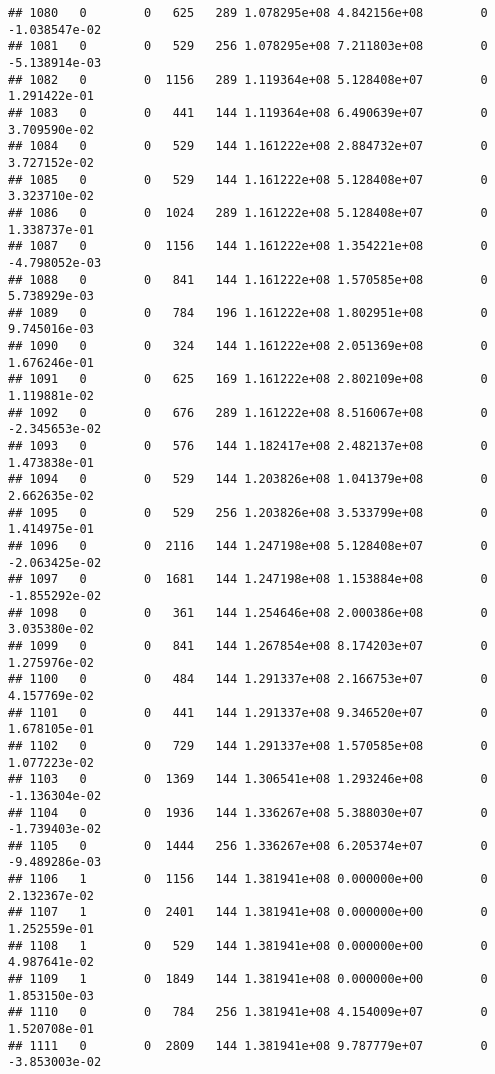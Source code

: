 \documentclass[
]{article}
\begin{document}
\begin{enumerate}
\begin{verbatim}
## 1080   0        0   625   289 1.078295e+08 4.842156e+08        0 -1.038547e-02
## 1081   0        0   529   256 1.078295e+08 7.211803e+08        0 -5.138914e-03
## 1082   0        0  1156   289 1.119364e+08 5.128408e+07        0  1.291422e-01
## 1083   0        0   441   144 1.119364e+08 6.490639e+07        0  3.709590e-02
## 1084   0        0   529   144 1.161222e+08 2.884732e+07        0  3.727152e-02
## 1085   0        0   529   144 1.161222e+08 5.128408e+07        0  3.323710e-02
## 1086   0        0  1024   289 1.161222e+08 5.128408e+07        0  1.338737e-01
## 1087   0        0  1156   144 1.161222e+08 1.354221e+08        0 -4.798052e-03
## 1088   0        0   841   144 1.161222e+08 1.570585e+08        0  5.738929e-03
## 1089   0        0   784   196 1.161222e+08 1.802951e+08        0  9.745016e-03
## 1090   0        0   324   144 1.161222e+08 2.051369e+08        0  1.676246e-01
## 1091   0        0   625   169 1.161222e+08 2.802109e+08        0  1.119881e-02
## 1092   0        0   676   289 1.161222e+08 8.516067e+08        0 -2.345653e-02
## 1093   0        0   576   144 1.182417e+08 2.482137e+08        0  1.473838e-01
## 1094   0        0   529   144 1.203826e+08 1.041379e+08        0  2.662635e-02
## 1095   0        0   529   256 1.203826e+08 3.533799e+08        0  1.414975e-01
## 1096   0        0  2116   144 1.247198e+08 5.128408e+07        0 -2.063425e-02
## 1097   0        0  1681   144 1.247198e+08 1.153884e+08        0 -1.855292e-02
## 1098   0        0   361   144 1.254646e+08 2.000386e+08        0  3.035380e-02
## 1099   0        0   841   144 1.267854e+08 8.174203e+07        0  1.275976e-02
## 1100   0        0   484   144 1.291337e+08 2.166753e+07        0  4.157769e-02
## 1101   0        0   441   144 1.291337e+08 9.346520e+07        0  1.678105e-01
## 1102   0        0   729   144 1.291337e+08 1.570585e+08        0  1.077223e-02
## 1103   0        0  1369   144 1.306541e+08 1.293246e+08        0 -1.136304e-02
## 1104   0        0  1936   144 1.336267e+08 5.388030e+07        0 -1.739403e-02
## 1105   0        0  1444   256 1.336267e+08 6.205374e+07        0 -9.489286e-03
## 1106   1        0  1156   144 1.381941e+08 0.000000e+00        0  2.132367e-02
## 1107   1        0  2401   144 1.381941e+08 0.000000e+00        0  1.252559e-01
## 1108   1        0   529   144 1.381941e+08 0.000000e+00        0  4.987641e-02
## 1109   1        0  1849   144 1.381941e+08 0.000000e+00        0  1.853150e-03
## 1110   0        0   784   256 1.381941e+08 4.154009e+07        0  1.520708e-01
## 1111   0        0  2809   144 1.381941e+08 9.787779e+07        0 -3.853003e-02

\end{verbatim}
\end{enumerate}
\end{document}
